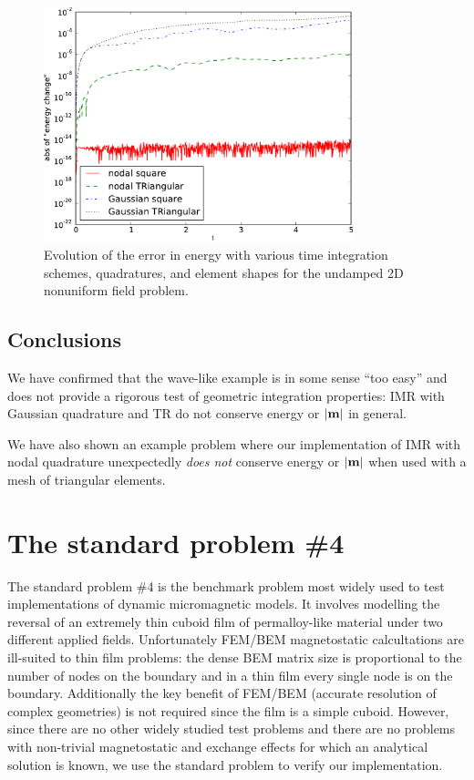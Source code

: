 \begin{figure}
  \centering
  \includegraphics[width=0.8\textwidth]
  {plots/nonuniform-h-triangles-energy-error/absofenergychangevstimes.pdf}
  \caption{
    Evolution of the error in energy
    with various time integration schemes, quadratures, and element shapes
    for the undamped 2D nonuniform field problem.
  }
  \label{fig:energy-error-triangle-mesh}
\end{figure}

\subsection{Conclusions}

We have confirmed that the wave-like example is in some sense ``too easy'' and does not provide a rigorous test of geometric integration properties: IMR with Gaussian quadrature and TR do not conserve energy or $\left|{\boldsymbol{\mathrm{m}}} \right|$ in general.

We have also shown an example problem where our implementation of IMR with nodal quadrature unexpectedly \emph{does not} conserve energy or $\left|{\boldsymbol{\mathrm{m}}} \right|$ when used with a mesh of triangular elements.


\FloatBarrier
\section{The \mumag standard problem \#4}

The \mumag standard problem \#4 \cite{mumag-website} is the benchmark problem most widely used to test implementations of dynamic micromagnetic models.
It involves modelling the reversal of an extremely thin cuboid film of permalloy-like material under two different applied fields.
Unfortunately FEM/BEM magnetostatic calcultations are ill-suited to thin film problems: the dense BEM matrix size is proportional to the number of nodes on the boundary and in a thin film every single node is on the boundary.
Additionally the key benefit of FEM/BEM (accurate resolution of complex geometries) is not required since the film is a simple cuboid.
However, since there are no other widely studied test problems and there are no problems with non-trivial magnetostatic and exchange effects for which an analytical solution is known, we use the standard problem to verify our implementation.


